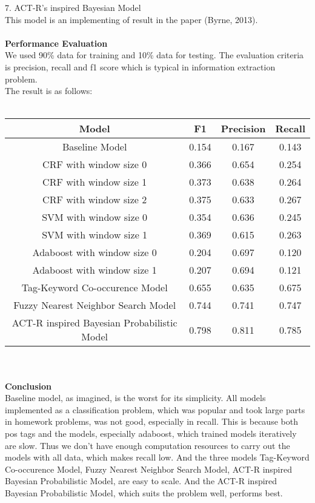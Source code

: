 \documentclass[paper=a4, fontsize=11pt]{scrartcl} %
\numberwithin{equation}{section} %
\numberwithin{figure}{section} %
\numberwithin{table}{section} %
\begin{document}
7. ACT-R's inspired Bayesian Model\\
This model is an implementing of result in the paper (Byrne, 2013).\\
\ \\
{\bf Performance Evaluation}\\
We used 90\% data for training and 10\% data for testing. The evaluation criteria is precision, recall and f1 score which is typical in information extraction problem.\\
The result is as follows: \\
\ \\
\begin{tabular}{|c|c|c|c|}
\hline
Model & F1 & Precision & Recall \\
\hline
Baseline Model & 0.154 & 0.167 & 0.143 \\
\hline
CRF with window size 0 & 0.366 & 0.654 & 0.254 \\
\hline
CRF with window size 1 & 0.373 & 0.638 & 0.264 \\
\hline
CRF with window size 2 & 0.375 & 0.633 & 0.267 \\
\hline
SVM with window size 0 & 0.354 & 0.636 & 0.245 \\
\hline
SVM with window size 1 & 0.369 & 0.615 & 0.263 \\
\hline
Adaboost with window size 0 & 0.204 & 0.697 & 0.120 \\
\hline
Adaboost with window size 1 & 0.207 & 0.694 & 0.121 \\
\hline
Tag-Keyword Co-occurence Model & 0.655 & 0.635 & 0.675 \\
\hline
Fuzzy Nearest Neighbor Search Model & 0.744 & 0.741 & 0.747 \\
\hline 
ACT-R inspired Bayesian Probabilistic Model & 0.798 & 0.811 & 0.785 \\
\hline 
\end{tabular}
\ \\
\ \\
{\bf Conclusion} \\
Baseline model, as imagined, is the worst for its simplicity. All models implemented as a classification problem, which was popular and took large parts in homework problems, was not good, especially in recall. This is because both pos tags and  the models, especially adaboost, which trained models iteratively are slow. Thus we don't have enough computation resources to carry out the models with all data, which makes recall low. And the three models Tag-Keyword Co-occurence Model, Fuzzy Nearest Neighbor Search Model, ACT-R inspired Bayesian Probabilistic Model, are easy to scale. And the ACT-R inspired Bayesian Probabilistic Model, which suits the problem well, performs best.
\end{document}
